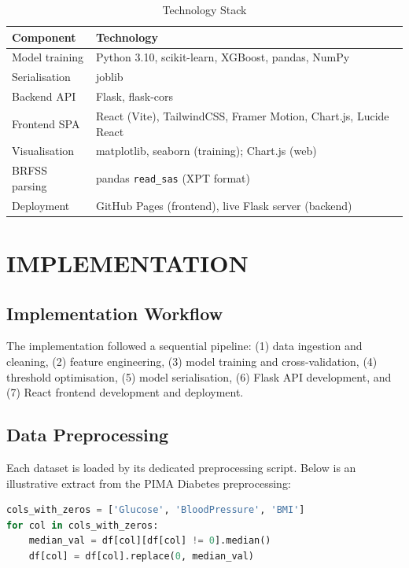 \documentclass[12pt,a4paper]{report}
\begin{document}
\begin{table}[H]
\centering
\caption{Technology Stack}
\label{tab:tech}
\begin{tabularx}{\textwidth}{lX}
\toprule
\textbf{Component} & \textbf{Technology} \\
\midrule
Model training & Python 3.10, scikit-learn, XGBoost, pandas, NumPy \\
Serialisation & joblib \\
Backend API & Flask, flask-cors \\
Frontend SPA & React (Vite), TailwindCSS, Framer Motion, Chart.js, Lucide React \\
Visualisation & matplotlib, seaborn (training); Chart.js (web) \\
BRFSS parsing & pandas \texttt{read\_sas} (XPT format) \\
Deployment & GitHub Pages (frontend), live Flask server (backend) \\
\bottomrule
\end{tabularx}
\end{table}

\chapter{IMPLEMENTATION}

\section{Implementation Workflow}

The implementation followed a sequential pipeline: (1) data ingestion and cleaning, (2) feature engineering, (3) model training and cross-validation, (4) threshold optimisation, (5) model serialisation, (6) Flask API development, and (7) React frontend development and deployment.

\section{Data Preprocessing}

Each dataset is loaded by its dedicated preprocessing script. Below is an illustrative extract from the PIMA Diabetes preprocessing:

\begin{lstlisting}[language=Python, caption=PIMA Diabetes Zero-Replacement]
cols_with_zeros = ['Glucose', 'BloodPressure', 'BMI']
for col in cols_with_zeros:
    median_val = df[col][df[col] != 0].median()
    df[col] = df[col].replace(0, median_val)
\end{lstlisting}
\end{document}

